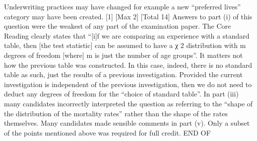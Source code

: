 \documentclass[a4paper,12pt]{article}
\begin{document}
Underwriting practices may have changed for example a new “preferred lives”
category may have been created.
[1]
[Max 2]
[Total 14]
Answers to part (i) of this question were the weakest of any part of the
examination paper. The Core Reading clearly states that “[i]f we are
comparing an experience with a standard table, then [the test statistic] can be
assumed to have a χ 2 distribution with m degrees of freedom [where] m is just
the number of age groups”. It matters not how the previous table was
constructed. In this case, indeed, there is no standard table as such, just the
results of a previous investigation. Provided the current investigation is
independent of the previous investigation, then we do not need to deduct any
degrees of freedom for the “choice of standard table”. In part (iii) many
candidates incorrectly interpreted the question as referring to the “shape of
the distribution of the mortality rates” rather than the shape of the rates
themselves. Many candidates made sensible comments in part (v). Only a
subset of the points mentioned above was required for full credit.
END OF 

\end{document}
